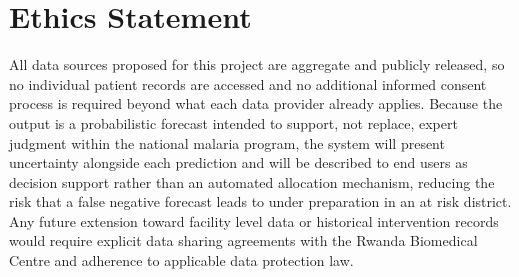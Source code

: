 \documentclass[11pt]{article}
\begin{document}
\section*{Ethics Statement}
All data sources proposed for this project are aggregate and publicly released, so no individual patient records are accessed and no additional informed consent process is required beyond what each data provider already applies. Because the output is a probabilistic forecast intended to support, not replace, expert judgment within the national malaria program, the system will present uncertainty alongside each prediction and will be described to end users as decision support rather than an automated allocation mechanism, reducing the risk that a false negative forecast leads to under preparation in an at risk district. Any future extension toward facility level data or historical intervention records would require explicit data sharing agreements with the Rwanda Biomedical Centre and adherence to applicable data protection law.

\small


\end{document}
